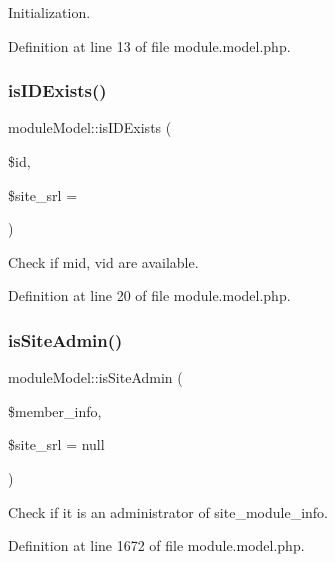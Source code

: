 Initialization. 



Definition at line 13 of file module.\+model.\+php.

\mbox{\label{classmoduleModel_a5f53ae1101876e8967cc3c40e54badcd}} 
\subsubsection{\texorpdfstring{is\+I\+D\+Exists()}{isIDExists()}}
{\footnotesize\ttfamily module\+Model\+::is\+I\+D\+Exists (\begin{DoxyParamCaption}\item[{}]{\$id,  }\item[{}]{\$site\+\_\+srl = {} }\end{DoxyParamCaption})}



Check if mid, vid are available. 



Definition at line 20 of file module.\+model.\+php.

\mbox{\label{classmoduleModel_aae55c42d2818ffd09f81d6cb215c59ff}} 
\subsubsection{\texorpdfstring{is\+Site\+Admin()}{isSiteAdmin()}}
{\footnotesize\ttfamily module\+Model\+::is\+Site\+Admin (\begin{DoxyParamCaption}\item[{}]{\$member\+\_\+info,  }\item[{}]{\$site\+\_\+srl = {\ttfamily null} }\end{DoxyParamCaption})}



Check if it is an administrator of site\+\_\+module\+\_\+info. 



Definition at line 1672 of file module.\+model.\+php.

\mbox{\label{classmoduleModel_adfde81ebf0fcb2814ba49ad23ce803ff}} 
